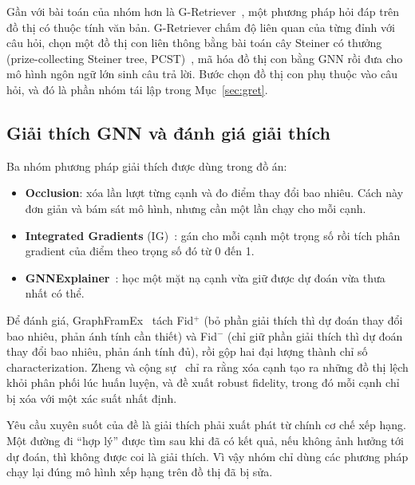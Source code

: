 Gần với bài toán của nhóm hơn là G-Retriever~\cite{he2024gretriever}, một phương pháp hỏi đáp trên đồ thị có thuộc tính văn bản. G-Retriever chấm độ liên quan của từng đỉnh với câu hỏi, chọn một đồ thị con liên thông bằng bài toán cây Steiner có thưởng (prize-collecting Steiner tree, PCST)~\cite{hegde2015pcst}, mã hóa đồ thị con bằng GNN rồi đưa cho mô hình ngôn ngữ lớn sinh câu trả lời. Bước chọn đồ thị con phụ thuộc vào câu hỏi, và đó là phần nhóm tái lập trong Mục~\ref{sec:gret}.

\subsection{Giải thích GNN và đánh giá giải thích}
Ba nhóm phương pháp giải thích được dùng trong đồ án:
\begin{itemize}
\item \textbf{Occlusion}: xóa lần lượt từng cạnh và đo điểm thay đổi bao nhiêu. Cách này đơn giản và bám sát mô hình, nhưng cần một lần chạy cho mỗi cạnh.
\item \textbf{Integrated Gradients} (IG)~\cite{sundararajan2017ig}: gán cho mỗi cạnh một trọng số rồi tích phân gradient của điểm theo trọng số đó từ 0 đến 1.
\item \textbf{GNNExplainer}~\cite{ying2019gnnexplainer}: học một mặt nạ cạnh vừa giữ được dự đoán vừa thưa nhất có thể.
\end{itemize}
Để đánh giá, GraphFramEx~\cite{amara2022graphframex} tách Fid$^+$ (bỏ phần giải thích thì dự đoán thay đổi bao nhiêu, phản ánh tính cần thiết) và Fid$^-$ (chỉ giữ phần giải thích thì dự đoán thay đổi bao nhiêu, phản ánh tính đủ), rồi gộp hai đại lượng thành chỉ số characterization. Zheng và cộng sự~\cite{zheng2024robust} chỉ ra rằng xóa cạnh tạo ra những đồ thị lệch khỏi phân phối lúc huấn luyện, và đề xuất robust fidelity, trong đó mỗi cạnh chỉ bị xóa với một xác suất nhất định.

Yêu cầu xuyên suốt của đề là giải thích phải xuất phát từ chính cơ chế xếp hạng. Một đường đi ``hợp lý'' được tìm sau khi đã có kết quả, nếu không ảnh hưởng tới dự đoán, thì không được coi là giải thích. Vì vậy nhóm chỉ dùng các phương pháp chạy lại đúng mô hình xếp hạng trên đồ thị đã bị sửa.
